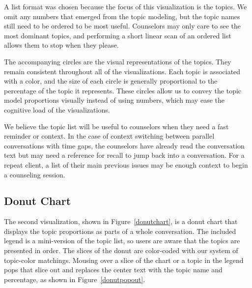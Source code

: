 A list format was chosen because the focus of this visualization is the topics. We
omit any numbers that emerged from the topic modeling, but the topic names still
need to be ordered to be most useful. Counselors may only care to see the most
dominant topics, and performing a short linear scan of an ordered list allows them to
stop when they please.

The accompanying circles are the visual representations of the topics. They remain
consistent throughout all of the visualizations. Each topic is associated with a color,
and the size of each circle is generally proportional to the percentage of the topic
it represents. These circles allow us to convey the topic model proportions visually
instead of using numbers, which may ease the cognitive load of the visualizations.

We believe the topic list will be useful to counselors when they need a fast reminder
or context. In the case of context switching between parallel conversations with time
gaps, the counselors have already read the conversation text but may need a reference
for recall to jump back into a conversation. For a repeat client, a list of their main
previous issues may be enough context to begin a counseling session.

\subsection{Donut Chart}

The second visualization, shown in Figure~\ref{donutchart}, is a donut chart that displays the
topic proportions as parts of a whole conversation. The included legend is a
mini-version of the topic list, so users are aware that the topics are presented in order. The
slices of the donut are color-coded with our system of topic-color matchings. Mousing
over a slice of the chart or a topic in the legend pops that slice out and replaces the
center text with the topic name and percentage, as shown in Figure~\ref{donutpopout}.

